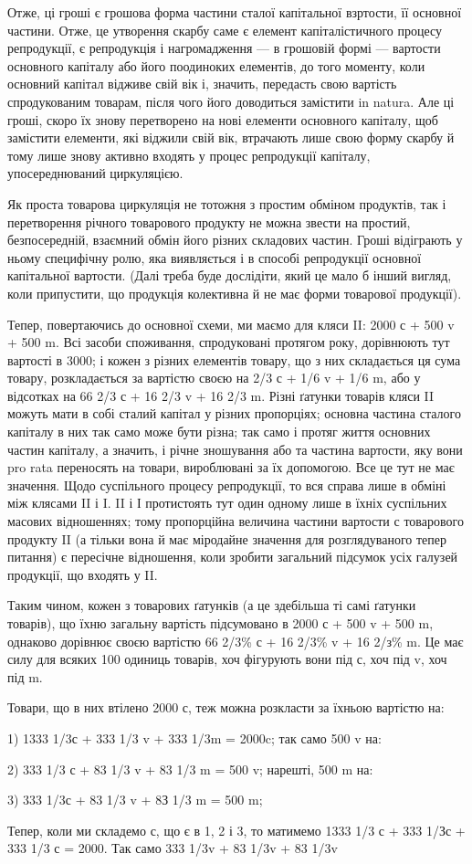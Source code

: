 Отже, ці гроші є грошова форма частини сталої капітальної взртости,
її основної частини. Отже, це утворення скарбу саме є елемент капіталістичного
процесу репродукції, є репродукція і нагромадження — в грошовій
формі — вартости основного капіталу або його поодиноких елементів,
до того моменту, коли основний капітал відживе свій вік і, значить, передасть
свою вартість спродукованим товарам, після чого його доводиться
замістити in natura. Але ці гроші, скоро їх знову перетворено на нові
елементи основного капіталу, щоб замістити елементи, які віджили свій
вік, втрачають лише свою форму скарбу й тому лише знову активно
входять у процес репродукції капіталу, упосереднюваний циркуляцією.

Як проста товарова циркуляція не тотожня з простим обміном продуктів,
так і перетворення річного товарового продукту не можна звести на
простий, безпосередній, взаємний обмін його різних складових частин.
Гроші відіграють у ньому специфічну ролю, яка виявляється і в способі
репродукції основної капітальної вартости. (Далі треба буде дослідіти,
який це мало б інший вигляд, коли припустити, що продукція колективна
й не має форми товарової продукції).

Тепер, повертаючись до основної схеми, ми маємо для кляси II:
2000 с + 500 v + 500 m. Всі засоби споживання, спродуковані протягом
року, дорівнюють тут вартості в 3000; і кожен з різних елементів товару,
що з них складається ця сума товару, розкладається за вартістю своєю
на 2/3 с + 1/6 v + 1/6 m, або у відсотках на 66 2/3 с + 16 2/3 v + 16 2/3 m.
Різні ґатунки товарів кляси II можуть мати в собі сталий капітал у
різних пропорціях; основна частина сталого капіталу в них так само
може бути різна; так само і протяг життя основних частин капіталу, а
значить, і річне зношування або та частина вартости, яку вони pro rata
переносять на товари, вироблювані за їх допомогою. Все це тут не має
значення. Щодо суспільного процесу репродукції, то вся справа лише в
обміні між клясами II і I. II і І протистоять тут один одному лише в
їхніх суспільних масових відношеннях; тому пропорційна величина частини
вартости с товарового продукту II (а тільки вона й має міродайне
значення для розглядуваного тепер питання) є пересічне відношення, коли
зробити загальний підсумок усіх галузей продукції, що входять у II.

Таким чином, кожен з товарових ґатунків (а це здебільша ті самі
ґатунки товарів), що їхню загальну вартість підсумовано в 2000 с + 500 v +
500 m, однаково дорівнює своєю вартістю 66 2/3\% с + 16 2/3\% v +
16 2/з\% m. Це має силу для всяких 100 одиниць товарів, хоч фігурують
вони під с, хоч під v, хоч під m.

Товари, що в них втілено 2000 с, теж можна розкласти за їхньою
вартістю на:

1) 1333 1/3с + 333 1/3 v + 333 1/3m = 2000c; так само 500 v на:

2) 333 1/3 с + 83 1/3 v + 83 1/3 m = 500 v; нарешті, 500 m на:

3) 333 1/3с + 83 1/3 v + 8З 1/3 m = 500 m;

Тепер, коли ми складемо с, що є в 1, 2 і 3, то матимемо 1333 1/3 с
+ 333 1/Зс + 333 1/3 с = 2000. Так само 333 1/3v + 83 1/3v + 83 1/3v
